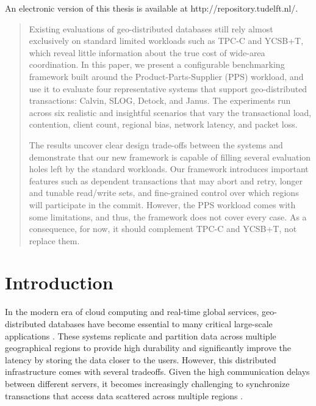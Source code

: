 \documentclass{article}
\begin{document}
\begin{center}
    An electronic version of this thesis is available at http://repository.tudelft.nl/.
\end{center}

\twocolumn
\let\clearpage\clearpagebackup  
\clearpage
\setcounter{page}{1}


\begin{abstract}
\label{sec: abstract}
Existing evaluations of geo-distributed databases still rely almost exclusively on standard limited workloads such as TPC-C and YCSB+T, which reveal little information about the true cost of wide-area coordination. In this paper, we present a configurable benchmarking framework built around the Product-Parts-Supplier (PPS) workload, and use it to evaluate four representative systems that support geo-distributed transactions: Calvin, SLOG, Detock, and Janus. The experiments run across six realistic and insightful scenarios that vary the transactional load, contention, client count, regional bias, network latency, and packet loss.

The results uncover clear design trade-offs between the systems and demonstrate that our new framework is capable of filling several evaluation holes left by the standard workloads. Our framework introduces important features such as dependent transactions that may abort and retry, longer and tunable read/write sets, and fine-grained control over which regions will participate in the commit. However, the PPS workload comes with some limitations, and thus, the framework does not cover every case. As a consequence, for now, it should complement TPC-C and YCSB+T, not replace them.
\end{abstract}

\section{Introduction}
\label{sec: introduction}

In the modern era of cloud computing and real-time global services, geo-distributed databases have become essential to many critical large-scale applications \cite{corbett2013spanner, bronson2013tao}. These systems replicate and partition data across multiple geographical regions to provide high durability and significantly improve the latency by storing the data closer to the users. However, this distributed infrastructure comes with several tradeoffs. Given the high communication delays between different servers, it becomes increasingly challenging to synchronize transactions that access data scattered across multiple regions \cite{bailis2013highly}.
\end{document}
